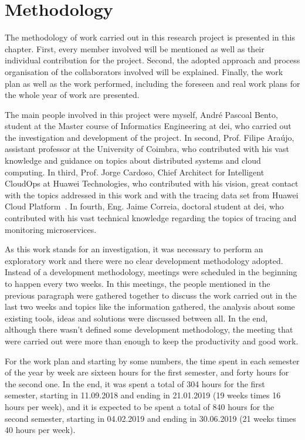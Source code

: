 \glsresetall
\chapter{Methodology}
\label{chap:methodology}

The methodology of work carried out in this research project is presented in this chapter. First, every member involved will be mentioned as well as their individual contribution for the project. Second, the adopted approach and process organisation of the collaborators involved will be explained. Finally, the work plan as well as the work performed, including the foreseen and real work plans for the whole year of work are presented.

The main people involved in this project were myself, André Pascoal Bento, student at the Master course of Informatics Engineering at \gls{dei}, who carried out the investigation and development of the project. In second, Prof. Filipe Araújo, assistant professor at the University of Coimbra, who contributed with his vast knowledge and guidance on topics about distributed systems and cloud computing. In third, Prof. Jorge Cardoso, Chief Architect for Intelligent CloudOps at Huawei Technologies, who contributed with his vision, great contact with the topics addressed in this work and with the tracing data set from Huawei Cloud Platform~\cite{huawei_cloud_platform}. In fourth, Eng. Jaime Correia, doctoral student at \gls{dei}, who contributed with his vast technical knowledge regarding the topics of tracing and monitoring microservices.


As this work stands for an investigation, it was necessary to perform an exploratory work and there were no clear development methodology adopted. Instead of a development methodology, meetings were scheduled in the beginning to happen every two weeks. In this meetings, the people mentioned in the previous paragraph were gathered together to discuss the work carried out in the last two weeks and topics like the information gathered, the analysis about some existing tools, ideas and solutions were discussed between all. In the end, although there wasn't defined some development methodology, the meeting that were carried out were more than enough to keep the productivity and good work.

For the work plan and starting by some numbers, the time spent in each semester of the year by week are sixteen hours for the first semester, and forty hours for the second one. In the end, it was spent a total of 304 hours for the first semester, starting in 11.09.2018 and ending in 21.01.2019 (19 weeks times 16 hours per week), and it is expected to be spent a total of 840 hours for the second semester, starting in 04.02.2019 and ending in 30.06.2019 (21 weeks times 40 hours per week).


